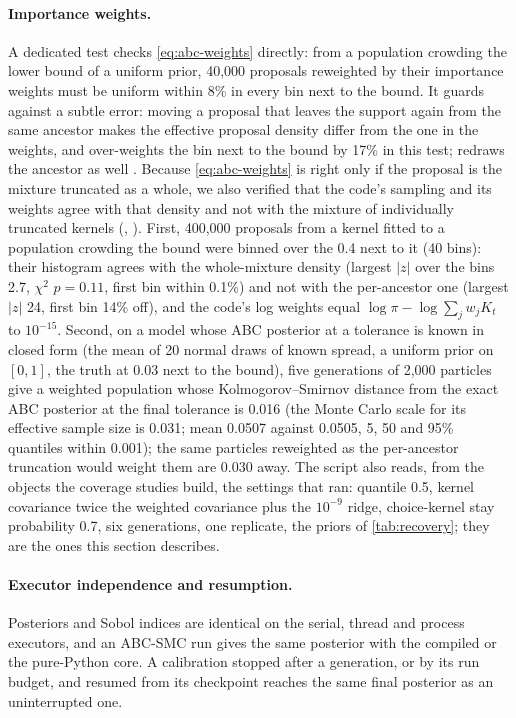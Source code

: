 \paragraph{Importance weights.} A dedicated test checks \cref{eq:abc-weights} directly: from a
population crowding the lower bound of a uniform prior, 40,000 proposals reweighted by their
importance weights must be uniform within 8\% in every bin next to the bound. It guards
against a subtle error: moving a proposal that leaves the support again from the same
ancestor makes the effective proposal density differ from the one in the weights, and
over-weights the bin next to the bound by 17\% in this test; \modelly{} redraws the ancestor
as well \citep{toni2009approximate}. Because \cref{eq:abc-weights} is right only if the
proposal is the mixture truncated as a whole, we also verified that the code's sampling and
its weights agree with that density and not with the mixture of individually truncated
kernels (, ).
First, 400,000 proposals from a kernel fitted to a population crowding the bound were
binned over the 0.4 next to it (40 bins): their histogram agrees with the whole-mixture
density (largest $|z|$ over the bins 2.7, $\chi^2$ $p = 0.11$, first bin within 0.1\%)
and not with the per-ancestor one (largest $|z|$ 24, first bin 14\% off), and the code's
log weights equal $\log \pi - \log \sum_j w_j K_t$ to $10^{-15}$. Second, on a model whose ABC
posterior at a tolerance is known in closed form (the mean of 20 normal draws of known
spread, a uniform prior on $[0, 1]$, the truth at 0.03 next to the bound), five
generations of 2,000 particles give a weighted population whose Kolmogorov--Smirnov
distance from the exact ABC posterior at the final tolerance is 0.016 (the Monte Carlo
scale for its effective sample size is 0.031; mean 0.0507 against 0.0505, 5, 50 and 95\%
quantiles within 0.001); the same particles reweighted as the per-ancestor truncation
would weight them are 0.030 away. The script also reads, from the objects the coverage
studies build, the settings that ran: quantile 0.5, kernel covariance twice the weighted
covariance plus the $10^{-9}$ ridge, choice-kernel stay probability 0.7, six generations,
one replicate, the priors of \cref{tab:recovery}; they are the ones this section
describes.

\paragraph{Executor independence and resumption.} Posteriors and Sobol indices are identical
on the serial, thread and process executors, and an ABC-SMC run gives the same posterior with
the compiled or the pure-Python core. A calibration stopped after a generation, or by its run
budget, and resumed from its checkpoint reaches the same final posterior as an uninterrupted
one.

